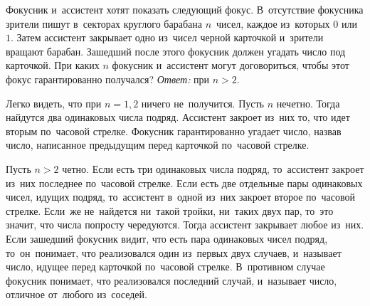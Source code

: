 \problem
Фокусник и~ассистент хотят показать следующий фокус.
В~отсутствие фокусника зрители пишут в~секторах круглого барабана $n$~чисел,
каждое из~которых $0$ или $1$.
Затем ассистент закрывает одно из~чисел черной карточкой и~зрители вращают
барабан.
Зашедший после этого фокусник должен угадать число под карточкой.
При каких $n$ фокусник и~ассистент могут договориться, чтобы этот фокус
гарантированно получался? 
\solution
\emph{Ответ:} при $n > 2$.
\par
Легко видеть, что при $n = 1, 2$ ничего не~получится.
Пусть $n$ нечетно.
Тогда найдутся два одинаковых числа подряд.
Ассистент закроет из~них то, что идет вторым по~часовой стрелке.
Фокусник гарантированно угадает число, назвав число, написанное предыдущим
перед карточкой по~часовой стрелке.
\par
Пусть $n > 2$ четно.
Если есть три одинаковых числа подряд, то~ассистент закроет из~них последнее
по~часовой стрелке.
Если есть две отдельные пары одинаковых чисел, идущих подряд, то~ассистент
в~одной из~них закроет второе по~часовой стрелке.
Если~же не~найдется ни~такой тройки, ни~таких двух пар, то~это значит, что
числа попросту чередуются.
Тогда ассистент закрывает любое из~них.
Если зашедший фокусник видит, что есть пара одинаковых чисел подряд,
то~он~понимает, что реализовался один из~первых двух случаев, и~называет число,
идущее перед карточкой по~часовой стрелке.
В~противном случае фокусник понимает, что реализовался последний случай,
и~называет число, отличное от~любого из~соседей. 
\endproblem
